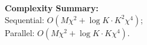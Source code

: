 \begin{algorithm}[t]
\BlankLine
{}

\BlankLine
\textbf{Complexity Summary:} \\
Sequential: $O(M\chi^2 + \log K \cdot K^2\chi^4)$; \\
Parallel: $O(M\chi^2 + \log K \cdot K\chi^4)$.

\end{algorithm}
